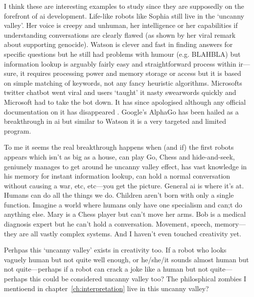 {I think these are interesting examples to study since they are supposedly on the forefront of \gls{ai} development. Life-like robots like Sophia still live in the `uncanny valley'. Her voice is creepy and unhuman, her intelligence or her capabilities if understanding conversations are clearly flawed (as shown by her viral remark about supporting genocide). Watson is clever and fast in finding answers for specific questions but he still had problems with humour (e.g. BLAHBLA) but information lookup is arguably fairly easy and straightforward process within \gls{ir}---sure, it requires processing power and memory storage or access but it is based on simple matching of keywords, not any fancy heuristic algorithms. Microsofts twitter chatbot went viral and users `taught' it nasty swearwords  quickly and Microsoft had to take the bot down. It has since apologised although any official documentation on it has disappeared . Google's AlphaGo has been hailed as a breakthrough in \gls{ai} but similar to Watson it is a very targeted and limited program. 

To me it seems the real breakthrough happens when (and if) the first robots appears which isn't as big as a house, can play Go, Chess and hide-and-seek, geniunely manages to get around he uncanny valley effect, has vast knowledge in his memory for instant information lookup, can hold a normal conversation without causing a war, etc, etc---you get the picture. General \gls{ai} is where it's at. Humans can do all the things we do. Children aren't born with only a single function. Imagine a world where humans only have one specialism and can;t do anything else. Mary is a Chess player but can't move her arms. Bob is a medical diagnosis expert but he can't hold a conversation. Movement, speech, memory---they are all vastly complex systems. And I haven't even touched creativity yet.

Perhpas this `uncanny valley' exists in creativity too. If a robot who looks vaguely human but not quite well enough, or he/she/it sounds almost human but not quite---perhaps if a robot can crack a joke like a human but not quite---perhaps this could be considered uncanny valley too? The philosphical zombies I mentioend in chapter~\ref{ch:interpretation} live in this uncanny valley?



}
